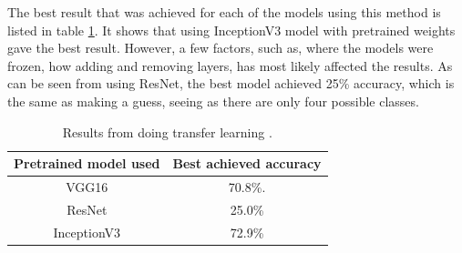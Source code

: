 The best result  that was achieved for each of the models using this method is listed in
 table \ref{table:transferLearning}. It shows that using InceptionV3 model with pretrained
 weights gave the best result. However, a few factors, such as, where the models were
 frozen, how adding and removing layers, has most likely affected the results. As can be
 seen from using ResNet, the best model achieved 25\% accuracy, which is the same as making a guess, seeing as there are only four possible classes. 

\begin{table}[h]
\centering
\begin{tabular}{ |c|c| } 
 \hline
 Pretrained model used &  Best achieved accuracy  \\ 
 \hline
 VGG16 & 70.8\%. \\ 
 \hline
 ResNet & 25.0\% \\ 
  \hline
 InceptionV3 & 72.9\% \\ 
 \hline
\end{tabular}
\caption{Results from doing transfer learning .}
\label{table:transferLearning}
\end{table}


\newpage